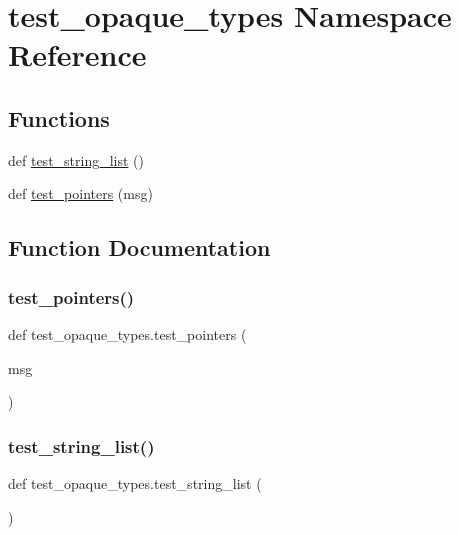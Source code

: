 \hypertarget{namespacetest__opaque__types}{}\section{test\+\_\+opaque\+\_\+types Namespace Reference}
\label{namespacetest__opaque__types}
\subsection*{Functions}
\begin{DoxyCompactItemize}
\item 
def \mbox{\hyperlink{namespacetest__opaque__types_af4ff0f32ec91d517ed8abb03be541cfe}{test\+\_\+string\+\_\+list}} ()
\item 
def \mbox{\hyperlink{namespacetest__opaque__types_a589fe81a69c66462bf993336922f2ef3}{test\+\_\+pointers}} (msg)
\end{DoxyCompactItemize}


\subsection{Function Documentation}
\mbox{\label{namespacetest__opaque__types_a589fe81a69c66462bf993336922f2ef3}} 
\subsubsection{\texorpdfstring{test\_pointers()}{test\_pointers()}}
{\footnotesize\ttfamily def test\+\_\+opaque\+\_\+types.\+test\+\_\+pointers (\begin{DoxyParamCaption}\item[{}]{msg }\end{DoxyParamCaption})}

\mbox{\label{namespacetest__opaque__types_af4ff0f32ec91d517ed8abb03be541cfe}} 
\subsubsection{\texorpdfstring{test\_string\_list()}{test\_string\_list()}}
{\footnotesize\ttfamily def test\+\_\+opaque\+\_\+types.\+test\+\_\+string\+\_\+list (\begin{DoxyParamCaption}{ }\end{DoxyParamCaption})}

